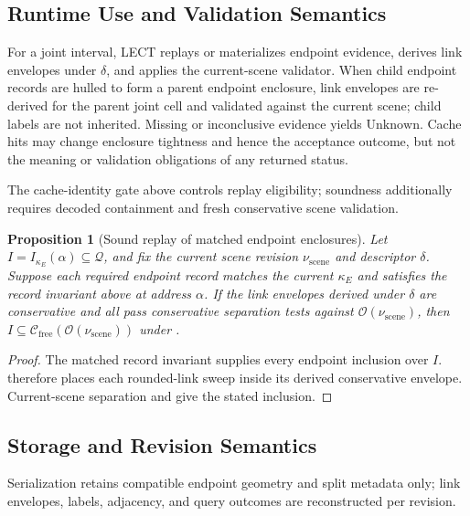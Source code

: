 \documentclass[journal]{IEEEtran}
\newtheorem{proposition}{Proposition}
\newcommand{\Cfree}{\ensuremath{\mathcal{C}_{\mathrm{free}}}}
\newcommand{\calO}{\ensuremath{\mathcal{O}}}
\newcommand{\Q}{\ensuremath{\mathcal{Q}}}
\begin{document}
\subsection{Runtime Use and Validation Semantics}

For a joint interval, LECT replays or materializes endpoint evidence, derives
link envelopes under $\delta$, and applies the current-scene validator. When
child endpoint records are hulled to form a parent endpoint enclosure, link
envelopes are re-derived for the parent joint cell and validated against the
current scene; child labels are not inherited. Missing or inconclusive evidence
yields $\mathrm{Unknown}$. Cache hits may change enclosure tightness and hence
the acceptance outcome, but not the meaning or validation obligations of any
returned status.

The cache-identity gate above controls replay eligibility; soundness additionally
requires decoded containment and fresh conservative scene validation.

\begin{proposition}[Sound replay of matched endpoint enclosures]
\label{prop:scene_safe_replay}
Let $I=I_{\kappa_E}(\alpha)\subseteq\Q$, and fix the current scene revision
$\nu_{\mathrm{scene}}$ and descriptor $\delta$. Suppose each required endpoint
record matches the current $\kappa_E$ and satisfies the record invariant above
at address $\alpha$. If the link envelopes derived under $\delta$ are
conservative and all pass conservative separation tests against
$\calO(\nu_{\mathrm{scene}})$, then
$I\subseteq\Cfree(\calO(\nu_{\mathrm{scene}}))$ under
.
\end{proposition}

\begin{proof}
The matched record invariant supplies every endpoint inclusion over $I$.
 therefore places each rounded-link sweep
inside its derived conservative envelope. Current-scene separation and
 give the stated inclusion.
\end{proof}

\subsection{Storage and Revision Semantics}\label{sec:lect_storage}

Serialization retains compatible endpoint geometry and split metadata only;
link envelopes, labels, adjacency, and query outcomes are reconstructed per
revision.
\end{document}
